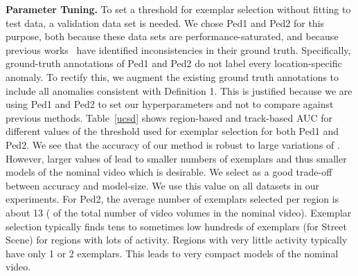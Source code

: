 \begin{table}[tb]
  \centering
  \caption{RBDC and TBDC scores (in \%) of our method for different thresholds () on UCSD Ped1 and Ped2. NUM denotes the total number of exemplars across all regions.}
  \label{ucsd}
  \vspace{-10pt}
\end{table}

\textbf{Parameter Tuning.} To set a threshold  for exemplar selection without fitting to test data, a validation data set is needed. We chose Ped1 and Ped2 for this purpose, both because these data sets are  performance-saturated, and because previous works~\cite{ramachandra2020learning} have identified inconsistencies in their ground truth. Specifically,
ground-truth annotations of Ped1 and Ped2 do not label every location-specific anomaly.
To rectify this, we augment the existing ground truth annotations to include all anomalies consistent with Definition 1.  This is justified because we are using Ped1 and Ped2 to set our hyperparameters and not to compare against previous methods.  Table~\ref{ucsd} shows region-based and track-based AUC for different values of the threshold  used for exemplar selection for both Ped1 and Ped2.  We see that the accuracy of our method is robust to large variations of .  However, larger values of  lead to smaller numbers of exemplars and thus smaller models of the nominal video which is desirable. We select  as a good trade-off between accuracy and model-size.  We use this value on all datasets in our experiments. For Ped2, the average number of exemplars selected per region is about 13 ( of the total number of video volumes in the nominal video).
Exemplar selection typically finds tens to sometimes low hundreds of exemplars (for Street Scene) for regions with lots of activity.  Regions with very little activity typically have only 1 or 2 exemplars.  This leads to very compact models of the nominal video.



